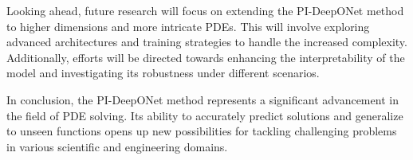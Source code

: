 \documentclass[a4paper, onecolumn, 12pt]{article}
\begin{document}
Looking ahead, future research will focus on extending the PI-DeepONet method to higher dimensions and more intricate PDEs. This will involve exploring advanced architectures and training strategies to handle the increased complexity. Additionally, efforts will be directed towards enhancing the interpretability of the model and investigating its robustness under different scenarios.

In conclusion, the PI-DeepONet method represents a significant advancement in the field of PDE solving. Its ability to accurately predict solutions and generalize to unseen functions opens up new possibilities for tackling challenging problems in various scientific and engineering domains.
\newpage
\singlespacing


 
\end{document}
